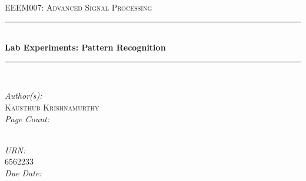 \begin{titlepage}
	\newcommand{\HRule}{\rule{\linewidth}{0.5mm}}
	\centering
	\textsc{\LARGE EEEM007: Advanced Signal Processing\\[1.5cm]}
	\HRule \\[0.4cm]
	{ \huge \bfseries Lab Experiments: Pattern Recognition}\\[0.4cm] 
	\HRule \\[1.5cm]
	\begin{minipage}{1\textwidth}
		\large
		\flushleft
		\emph{Author(s):}\hspace{0.2cm}\textsc{\\Kausthub Krishnamurthy\\ [0.25cm]}
		\emph{Page Count:}\\
		\hspace{0.7cm}	
		\pageref{LastPage}\\[0.5cm]
	\end{minipage}
	\begin{minipage}{1\textwidth}
		\flushright
		\vspace{-2.1cm}
		\emph{URN:}\hspace{0.7cm}	
		\\6562233\\[0.5cm]
		\emph{Due Date:}

\hspace{0.55cm}{May 7, 2019}\\[0.5cm]	%
        \vfill
	\end{minipage}
\vspace{-1cm}
\end{titlepage}